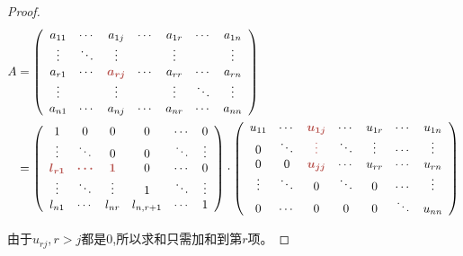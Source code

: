 \begin{proof}
    \begin{equation}
        \begin{aligned}
            A & =\left(\begin{array}{ c c c c c c c }
            a_{11} & \cdots  & a_{1j} & \cdots  & a_{1r} & \cdots  & a_{1n}\\
            \vdots  & \ddots  & \vdots  &  & \vdots  &  & \vdots \\
            a_{r1} & \cdots  & \boldsymbol{\textcolor[rgb]{0.72,0.33,0.31}{a_{rj}}} & \cdots  & a_{rr} & \cdots  & a_{rn}\\
            \vdots  &  & \vdots  &  & \vdots  & \ddots  & \vdots \\
            a_{n1} & \cdots  & a_{nj} & \cdots  & a_{nr} & \cdots  & a_{nn}
            \end{array}\right)\\
             & =\left(\begin{array}{ c c c c c c }
            1 & 0 & 0 & 0 & \cdots  & 0\\
            \vdots  & \ddots  & 0 & 0 & \ddots  & \vdots \\
            \boldsymbol{\textcolor[rgb]{0.72,0.33,0.31}{l}\textcolor[rgb]{0.72,0.33,0.31}{_{r1}}} & \boldsymbol{\textcolor[rgb]{0.72,0.33,0.31}{\cdots }} & \boldsymbol{\textcolor[rgb]{0.72,0.33,0.31}{1}} & 0 & \cdots  & 0\\
            \vdots  & \ddots  & \vdots  & 1 & \ddots  & \vdots \\
            l_{n1} & \cdots  & l_{nr} & l_{n,r+1} & \cdots  & 1
            \end{array}\right) \cdot \left(\begin{array}{ c c c c c c c }
            u_{11} & \cdots  & \boldsymbol{\textcolor[rgb]{0.72,0.33,0.31}{u_{1j}}} & \cdots  & u_{1r} & \cdots  & u_{1n}\\
            0 & \ddots  & \boldsymbol{\textcolor[rgb]{0.72,0.33,0.31}{\vdots }} & \ddots  & \vdots  & \cdots  & \vdots \\
            0 & 0 & \boldsymbol{\textcolor[rgb]{0.72,0.33,0.31}{u_{jj}}} & \cdots  & u_{rr} & \cdots  & u_{rn}\\
            \vdots  & \ddots  & 0 & \ddots  & 0 & \cdots  & \vdots \\
            0 & \cdots  & 0 & 0 & 0 & \ddots  & u_{nn}
            \end{array}\right)
            \end{aligned}
    \end{equation}

    由于$u_{rj}, r > j$都是0,所以求和只需加和到第$r$项。
\end{proof}


